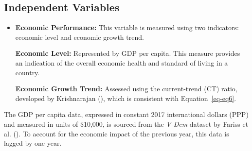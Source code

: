 \documentclass[
  12pt,
]{report}
\begin{document}
\subsection{Independent Variables}\label{independent-variables}

\begin{itemize}
\item
  \textbf{Economic Performance:} This variable is measured using two
  indicators: economic level and economic growth trend.

  \textbf{Economic Level:} Represented by GDP per capita. This measure
  provides an indication of the overall economic health and standard of
  living in a country.

  \textbf{Economic Growth Trend:} Assessed using the current-trend (CT)
  ratio, developed by Krishnarajan
  (), which is consistent with
  Equation~\ref{eq-eq6}.
\end{itemize}

The GDP per capita data, expressed in constant 2017 international
dollars (PPP) and measured in units of \$10,000, is sourced from the
\emph{V-Dem} dataset by Fariss et al. ().
To account for the economic impact of the previous year, this data is
lagged by one year.
\end{document}

